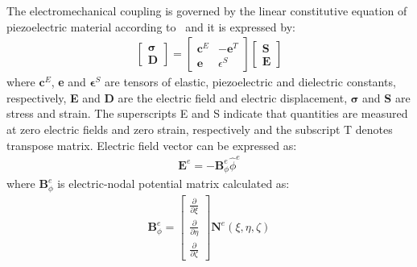 \documentclass[materials,article,submit,moreauthors,pdftex]{Definitions/mdpi}
\providecommand{\DIFadd}[1]{{\protect\color{blue}{#1}}} %
\providecommand{\DIFaddbegin}{} %
\providecommand{\DIFaddend}{} %
\begin{document}
The electromechanical coupling is governed by the linear constitutive equation of piezoelectric material according to~\cite{giurgiutiumicromechatronics} and it is expressed by:
\begin{eqnarray}
\left [ 
\begin {array}{c}
\boldsymbol{\sigma}\\
\textbf{D}
\end{array}\right ]=
\left [ 
\begin{array}{cc}
\textbf{c}^E & -\textbf{e}^T \\
\textbf{e} & \epsilon^S 
\end{array} \right ]
\left[ 
\begin{array}{c}
\textbf{S}\\
\textbf{E} 
\end{array} \right ]
\end{eqnarray}
where \(\textbf{c}^E\), \textbf{e} and \(\boldsymbol{\epsilon}^S\) are tensors of elastic, piezoelectric and dielectric constants, respectively, \textbf{E} and \textbf{D} are the electric field and electric displacement, \(\boldsymbol{\sigma}\) and \textbf{S} are stress and strain.
The superscripts E and S indicate that quantities are measured at zero electric fields and zero strain, respectively and the subscript T denotes transpose matrix.
Electric field vector can be expressed as:
\begin{eqnarray}
\textbf{E}^e=-\textbf{B}_\phi^e \widehat{\phi}^e
\end{eqnarray}
where \(\textbf{B}_\phi^e\) is \DIFaddbegin \DIFadd{the }\DIFaddend electric-nodal potential matrix calculated as:
\begin{eqnarray}
\textbf{B}_\phi^e=
\left[ \begin{array}{c}
\frac{\partial }{\partial \xi}\\
\frac{\partial }{\partial \eta}\\
\frac{\partial }{\partial \zeta}
\end{array} \right]\textbf{N}^e(\xi,\eta,\zeta)
\end{eqnarray}
\end{document}
